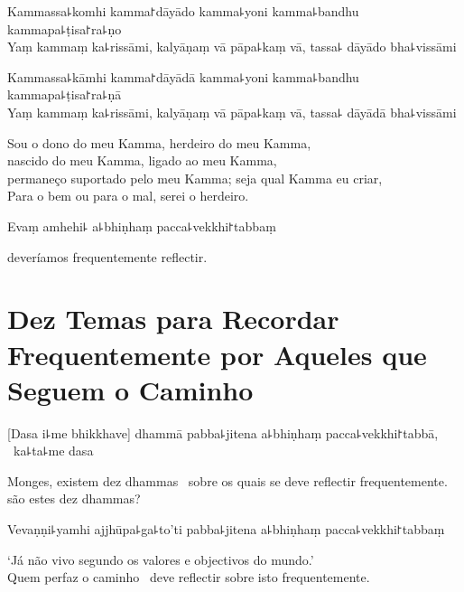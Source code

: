 %
Kammassa꜕komhi kamma꜓dāyādo kamma꜕yoni kamma꜕bandhu kammapa꜕ṭisa꜓ra꜕ṇo\\
Yaṃ kammaṃ ka꜕rissāmi, kalyāṇaṃ vā pāpa꜕kaṃ vā, tassa꜕ dāyādo bha꜕vissāmi

\clearpage

%
Kammassa꜕kāmhi kamma꜓dāyādā kamma꜕yoni kamma꜕bandhu kammapa꜕ṭisa꜓ra꜕ṇā\\
Yaṃ kammaṃ ka꜕rissāmi, kalyāṇaṃ vā pāpa꜕kaṃ vā, tassa꜕ dāyādā bha꜕vissāmi

\begin{english}
  Sou o dono do meu Kamma, herdeiro do meu Kamma,\\
  nascido do meu Kamma, ligado ao meu Kamma,\\
  permaneço suportado pelo meu Kamma; seja qual Kamma eu criar,\\
  Para o bem ou para o mal,  serei o herdeiro.
\end{english}

Evaṃ amhehi꜕ a꜕bhiṇhaṃ pacca꜕vekkhi꜓tabbaṃ

\begin{english}
   deveríamos frequentemente reflectir.
\end{english}

\chapter[Dez Temas]{Dez Temas para Recordar Frequentemente por Aqueles que Seguem o Caminho}


\begin{leader}
\end{leader}

[Dasa i꜕me bhikkhave] dhammā pabba꜕jitena a꜕bhiṇhaṃ pacca꜕vekkhi꜓tabbā, \pause\ ka꜕ta꜕me dasa

\begin{english}
  Monges, existem dez dhammas \pause\ sobre os quais se deve reflectir frequentemente. \pause\  são estes dez dhammas?
\end{english}

Vevaṇṇi꜕yamhi ajjhūpa꜕ga꜕to'ti pabba꜕jitena a꜕bhiṇhaṃ pacca꜕vekkhi꜓tabbaṃ

\begin{english}
  `Já não vivo segundo os valores e objectivos do mundo.' \pause\\
  Quem perfaz o caminho \pause\ deve reflectir sobre isto frequentemente.
\end{english}

